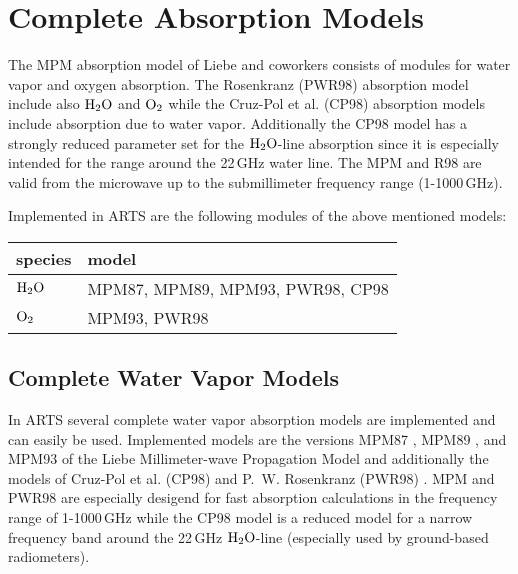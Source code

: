 


\section{Complete Absorption Models}
\label{levelb:CompAbsMod}
The MPM absorption model of Liebe and coworkers consists of modules for 
water vapor and oxygen absorption. The Rosenkranz (PWR98) absorption 
model include also $\mbox{H}_2\mbox{O}$ and $\mbox{O}_2$ while the Cruz-Pol et al. (CP98) absorption 
models include absorption due to water vapor. Additionally 
the CP98 model has a strongly reduced parameter set for the $\mbox{H}_2\mbox{O}$-line 
absorption since it is especially intended for the range around the 
22\,GHz water line. The MPM and R98 are valid from the microwave 
up to the submillimeter frequency range (1-1000\,GHz).

Implemented in ARTS are the following modules of the above mentioned models:
%
\begin{center}
\begin{tabular}{ll}
\hline
species & model\\
\hline
$\mbox{H}_2\mbox{O}$ & MPM87, MPM89, MPM93, PWR98, CP98 \\
$\mbox{O}_2$  & MPM93, PWR98 \\
\hline
\end{tabular}
\end{center}




\subsection{Complete Water Vapor Models}
\label{levelc:CompWatVapMod}
In ARTS several complete water vapor absorption models are implemented and 
can easily be used. Implemented models are the versions 
MPM87 \citep{liebeandlayton:87}, MPM89 \citep{liebe:89}, and 
MPM93 \citep{liebeetal:93} of the Liebe Millimeter-wave Propagation Model 
and additionally the models of Cruz-Pol et al. (CP98) \citep{cruzpol:98} 
and P.~W. Rosenkranz (PWR98) \citep{pwr:98}. 
MPM and PWR98 are especially desigend for fast absorption calculations in 
the frequency range of 1-1000\,GHz while the CP98 model is a reduced model 
for a narrow frequency band around the 22\,GHz $\mbox{H}_2\mbox{O}$-line (especially used 
by ground-based radiometers).

